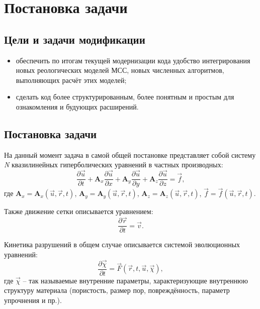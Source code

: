 \documentclass[a4paper,12pt]{article}
\numberwithin{equation}{section}
\begin{document}
\section{Постановка задачи}

\subsection{Цели и задачи модификации}	
	\begin{itemize}
		\item{обеспечить по итогам текущей модернизации кода удобство интегрирования новых 	реологических моделей МСС, новых численных алгоритмов, выполняющих расчёт этих моделей;}
		\item{сделать код более структурированным, более понятным и простым для ознакомления и будующих расширений.}
	\end{itemize}
	
\subsection{Постановка задачи}

	На данный момент задача в самой общей постановке представляет собой систему \textit{N} квазилинейных гиперболических уравнений в частных производных:
\begin{equation}
	\label{main_equation}
	\frac{\partial\vec{u}}{\partial{t}}+\mathbf{A}_x\frac{\partial\vec{u}}{\partial{x}}+
	\mathbf{A}_y\frac{\partial\vec{u}}{\partial{y}}+
	\mathbf{A}_z\frac{\partial\vec{u}}{\partial{z}}=\vec{f},
\end{equation}
	где $\mathbf{A}_x = \mathbf{A}_x(\vec{u}, \vec{r}, t)$, $\mathbf{A}_y = \mathbf{A}_y(\vec{u}, \vec{r}, t)$, $\mathbf{A}_z = \mathbf{A}_z(\vec{u}, \vec{r}, t)$, $\vec{f} = \vec{f}(\vec{u}, \vec{r}, t)$.
	
	Также движение сетки описывается уравнением:
\begin{equation}
	\label{mesh_movement_equation}
	\frac{\partial\vec{r}}{\partial{t}}=\vec{v}.
\end{equation}	
	
	Кинетика разрушений в общем случае описывается системой эволюционных уравнений:
\begin{equation}
	\label{failure_equations}
	\frac{\partial{\vec{\chi}}}{\partial{t}}=\vec{F}(\vec{r}, t, \vec{u}, \vec{\chi}),
\end{equation}		
	где $\vec{\chi}$ -- так называемые внутренние параметры, характеризующие внутреннюю структуру материала (пористость, размер пор, повреждённость, параметр упрочнения и пр.).
	
\end{document}
